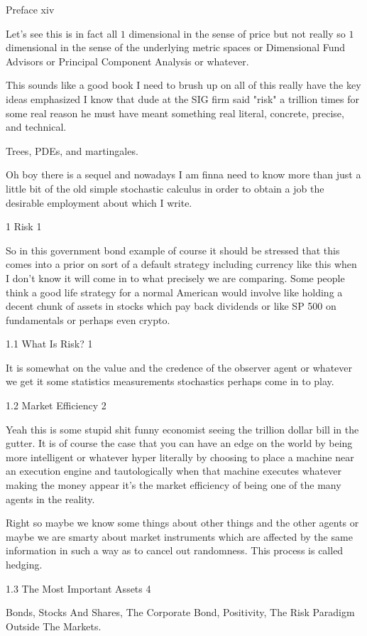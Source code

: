 Preface xiv

Let's see this is in fact all $1$ dimensional in the sense of price but not really so $1$ dimensional in the sense of the underlying metric spaces or Dimensional Fund Advisors or Principal Component Analysis or whatever.

This sounds like a good book I need to brush up on all of this really have the key ideas emphasized I know that dude at the SIG firm said "risk" a trillion times for some real reason he must have meant something real literal, concrete, precise, and technical.

Trees, PDEs, and martingales.

Oh boy there is a sequel and nowadays I am finna need to know more than just a little bit of the old simple stochastic calculus in order to obtain a job the desirable employment about which I write.

1 Risk 1

So in this government bond example of course it should be stressed that this comes into a prior on sort of a default strategy including currency like this when I don't know it will come in to what precisely we are comparing. Some people think a good life strategy for a normal American would involve like holding a decent chunk of assets in stocks which pay back dividends or like SP 500 on fundamentals or perhaps even crypto.

1.1 What Is Risk? 1

It is somewhat on the value and the credence of the observer agent or whatever we get it some statistics measurements stochastics perhaps come in to play.

1.2 Market Efficiency 2

Yeah this is some stupid shit funny economist seeing the trillion dollar bill in the gutter. It is of course the case that you can have an edge on the world by being more intelligent or whatever hyper literally by choosing to place a machine near an execution engine and tautologically when that machine executes whatever making the money appear it's the market efficiency of being one of the many agents in the reality.

Right so maybe we know some things about other things and the other agents or maybe we are smarty about market instruments which are affected by the same information in such a way as to cancel out randomness. This process is called hedging.

1.3 The Most Important Assets 4

Bonds, Stocks And Shares, The Corporate Bond, Positivity, The Risk Paradigm Outside The Markets.


